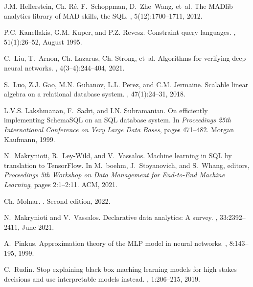 \documentclass{article}
\begin{document}
\begin{thebibliography}{GSSVdB24}
J.M. Hellerstein, Ch. R\'e, F.~Schoppman, D.~Zhe~Wang, et~al.
\newblock The {MADlib} analytics library of {MAD} skills, the {SQL}.
, 5(12):1700--1711, 2012.

P.C. Kanellakis, G.M. Kuper, and P.Z. Revesz.
\newblock Constraint query languages.
, 51(1):26--52, August
  1995.

C.~Liu, T.~Arnon, Ch. Lazarus, Ch. Strong, et~al.
\newblock Algorithms for verifying deep neural networks.
,
  4(3--4):244--404, 2021.

S.~Luo, Z.J. Gao, M.N. Gubanov, L.L. Perez, and C.M. Jermaine.
\newblock Scalable linear algebra on a relational database system.
, 47(1):24--31, 2018.

L.V.S. Lakshmanan, F.~Sadri, and I.N. Subramanian.
\newblock On efficiently implementing {SchemaSQL} on an {SQL} database system.
\newblock In {\em Proceedings 25th International Conference on Very Large Data
  Bases}, pages 471--482. Morgan Kaufmann, 1999.

N.~Makrynioti, R.~Ley-Wild, and V.~Vassalos.
\newblock Machine learning in {SQL} by translation to {TensorFlow}.
\newblock In M.~boehm, J.~Stoyanovich, and S.~Whang, editors, {\em Proceedings
  5th Workshop on Data Management for End-to-End Machine Learning}, pages
  2:1--2:11. ACM, 2021.

Ch. Molnar.
.
\newblock Second edition, 2022.

N.~Makrynioti and V.~Vassalos.
\newblock Declarative data analytics: A survey.
,
  33:2392--2411, June 2021.

A.~Pinkus.
\newblock Approximation theory of the {MLP} model in neural networks.
, 8:143--195, 1999.

C.~Rudin.
\newblock Stop explaining black box maching learning models for high stakes
  decisions and use interpretable models instead.
, 1:206--215, 2019.


\end{thebibliography}
\end{document}
